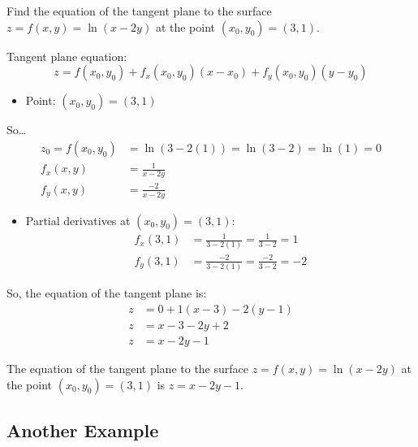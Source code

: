 \documentclass{article}
\begin{document}
\begin{examplebox}
    Find the equation of the tangent plane to the surface \( z = f(x, y) = \ln(x - 2y) \) at the point \( (x_0, y_0) = (3, 1) \).

    \begin{solutionbox}
    Tangent plane equation:
    \[
        z = f(x_0, y_0) + f_x(x_0, y_0)(x - x_0) + f_y(x_0, y_0)(y - y_0)
    \]
    \begin{itemize}
        \item Point: \( (x_0, y_0) = (3, 1) \)
    \end{itemize}
    
    So\dots
    \begin{align*}
        z_0 = f(x_0, y_0) &= \ln(3 - 2(1)) = \ln(3 - 2) = \ln(1) = 0 \\
        f_x(x, y) &= \frac{1}{x - 2y} \\
        f_y(x, y) &= \frac{-2}{x - 2y}
    \end{align*}
    \begin{itemize}
        \item Partial derivatives at \( (x_0, y_0) = (3, 1) \):
        \begin{align*}
            f_x(3, 1) &= \frac{1}{3 - 2(1)} = \frac{1}{3 - 2} = 1 \\
            f_y(3, 1) &= \frac{-2}{3 - 2(1)} = \frac{-2}{3 - 2} = -2
        \end{align*}
    \end{itemize}
    So, the equation of the tangent plane is:
    \begin{align*}
        z &= 0 + 1(x - 3) - 2(y - 1) \\
        z &= x - 3 - 2y + 2 \\
        z &= x - 2y - 1
    \end{align*}
    \begin{answerbox}
        The equation of the tangent plane to the surface \( z = f(x, y) = \ln(x - 2y) \) at the point \( (x_0, y_0) = (3, 1) \) is \( z = x - 2y - 1 \).
    \end{answerbox}
\end{solutionbox}
\end{examplebox}

\subsection*{Another Example}
\end{document}
